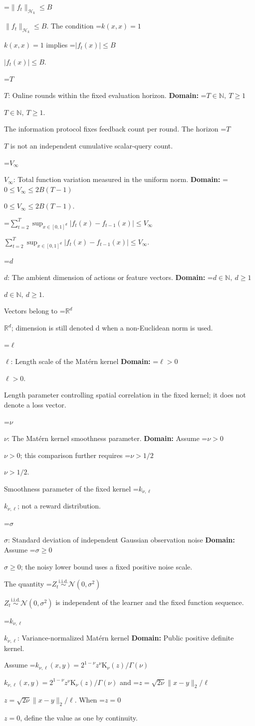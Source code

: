 \documentclass[10pt,a4paper]{article}
\newcommand{\AtlasMath}[1]{\par\begingroup\centering\setbox0=\hbox{$\displaystyle #1$}\ifdim\wd0>1.4\linewidth\typeout{ATLAS WIDE FORMULA: \the\wd0}\fi\ifdim\wd0>\linewidth\resizebox{\linewidth}{!}{\box0}\else\box0\fi\par\endgroup}
\newcommand{\AtlasInlineMath}[1]{\begingroup\setbox0=\hbox{$#1$}\ifdim\wd0>.4\linewidth\endgroup\AtlasMath{#1}\else\endgroup$#1$\fi}
\begin{document}
\AtlasInlineMath{\|f_t\|_{\mathcal H_k}\le B}. The condition \AtlasInlineMath{k(x,x)=1} implies \AtlasInlineMath{|f_t(x)|\le B}.

\AtlasInlineMath{T}: Online rounds within the fixed evaluation horizon. \textbf{Domain:} \AtlasInlineMath{T\in\mathbb N,\ T\ge1}.

The information protocol fixes feedback count per round. The horizon \AtlasInlineMath{T} is not an independent cumulative scalar-query count.

\AtlasInlineMath{V_\infty}: Total function variation measured in the uniform norm. \textbf{Domain:} \AtlasInlineMath{0\le V_\infty\le2B(T-1)}.

\AtlasInlineMath{\sum_{t=2}^T\sup_{x\in[0,1]^d}|f_t(x)-f_{t-1}(x)|\le V_\infty}.

\AtlasInlineMath{d}: The ambient dimension of actions or feature vectors. \textbf{Domain:} \AtlasInlineMath{d\in\mathbb N,\ d\ge1}.

Vectors belong to \AtlasInlineMath{\mathbb R^d}; dimension is still denoted d when a non-Euclidean norm is used.

\AtlasInlineMath{\ell}: Length scale of the Matérn kernel \textbf{Domain:} \AtlasInlineMath{\ell>0}.

Length parameter controlling spatial correlation in the fixed kernel; it does not denote a loss vector.

\AtlasInlineMath{\nu}: The Matérn kernel smoothness parameter. \textbf{Domain:} Assume \AtlasInlineMath{\nu>0}; this comparison further requires \AtlasInlineMath{\nu>1/2}.

Smoothness parameter of the fixed kernel \AtlasInlineMath{k_{\nu,\ell}}; not a reward distribution.

\AtlasInlineMath{\sigma}: Standard deviation of independent Gaussian observation noise \textbf{Domain:} Assume \AtlasInlineMath{\sigma\ge0}; the noisy lower bound uses a fixed positive noise scale.

The quantity \AtlasInlineMath{Z_t\overset{\mathrm{i.i.d.}}\sim\mathcal N(0,\sigma^2)} is independent of the learner and the fixed function sequence.

\AtlasInlineMath{k_{\nu,\ell}}: Variance-normalized Matérn kernel \textbf{Domain:} Public positive definite kernel.

Assume \AtlasInlineMath{k_{\nu,\ell}(x,y)=2^{1-\nu}z^\nu\mathrm K_\nu(z)/\Gamma(\nu)} and \AtlasInlineMath{z=\sqrt{2\nu}\|x-y\|_2/\ell}. When \AtlasInlineMath{z=0}, define the value as one by continuity.
\end{document}
